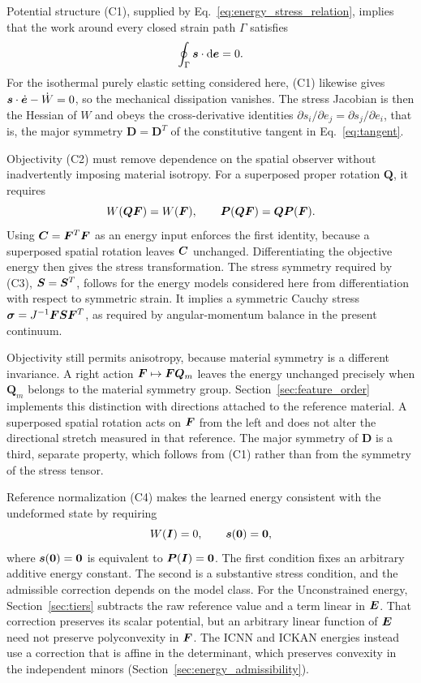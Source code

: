 Potential structure (C1), supplied by Eq.~\eqref{eq:energy_stress_relation}, implies that the work around every closed strain path $\Gamma$ satisfies
\begin{equation}
 \oint_{\Gamma}\bm s\cdot\mathrm d\bm e=0 .
 \label{eq:conservative_requirement}
\end{equation}
For the isothermal purely elastic setting considered here, (C1) likewise gives $\bm s\cdot\dot{\bm e}-\dot W=0$, so the mechanical dissipation vanishes. The stress Jacobian is then the Hessian of $W$ and obeys the cross-derivative identities $\partial s_i/\partial e_j=\partial s_j/\partial e_i$, that is, the major symmetry $\bm D=\bm D^T$ of the constitutive tangent in Eq.~\eqref{eq:tangent}.

Objectivity (C2) must remove dependence on the spatial observer without inadvertently imposing material isotropy. For a superposed proper rotation $\bm Q$, it requires
\begin{equation}
 W(\bm Q\bm F)=W(\bm F),\qquad
 \bm P(\bm Q\bm F)=\bm Q\bm P(\bm F).
\end{equation}
Using $\bm C=\bm F^T\bm F$ as an energy input enforces the first identity, because a superposed spatial rotation leaves $\bm C$ unchanged. Differentiating the objective energy then gives the stress transformation. The stress symmetry required by (C3), $\bm S=\bm S^T$, follows for the energy models considered here from differentiation with respect to symmetric strain. It implies a symmetric Cauchy stress $\bm\sigma=J^{-1}\bm F\bm S\bm F^T$, as required by angular-momentum balance in the present continuum.

Objectivity still permits anisotropy, because material symmetry is a different invariance. A right action $\bm F\mapsto\bm F\bm Q_m$ leaves the energy unchanged precisely when $\bm Q_m$ belongs to the material symmetry group. Section~\ref{sec:feature_order} implements this distinction with directions attached to the reference material. A superposed spatial rotation acts on $\bm F$ from the left and does not alter the directional stretch measured in that reference. The major symmetry of $\bm D$ is a third, separate property, which follows from (C1) rather than from the symmetry of the stress tensor.

Reference normalization (C4) makes the learned energy consistent with the undeformed state by requiring
\begin{equation}
 W(\bm I)=0,\qquad \bm s(\bm0)=\bm0,
\end{equation}
where $\bm s(\bm0)=\bm0$ is equivalent to $\bm P(\bm I)=\bm0$. The first condition fixes an arbitrary additive energy constant. The second is a substantive stress condition, and the admissible correction depends on the model class. For the Unconstrained energy, Section~\ref{sec:tiers} subtracts the raw reference value and a term linear in $\bm E$. That correction preserves its scalar potential, but an arbitrary linear function of $\bm E$ need not preserve polyconvexity in $\bm F$. The ICNN and ICKAN energies instead use a correction that is affine in the determinant, which preserves convexity in the independent minors (Section~\ref{sec:energy_admissibility}).

